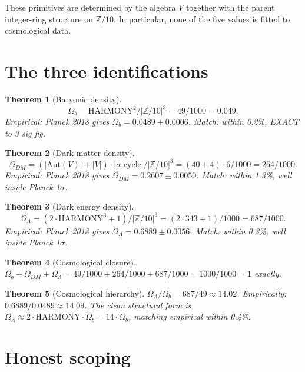 \documentclass[11pt,reqno]{amsart}
\theoremstyle{plain}
\newtheorem{theorem}{Theorem}[section]
\theoremstyle{definition}
\theoremstyle{remark}
\newcommand{\Z}{\mathbb{Z}}
\newcommand{\Aut}{\mathrm{Aut}}
\begin{document}
These primitives are determined by the algebra $V$ together with the
parent integer-ring structure on $\Z/10$. In particular, none of the
five values is fitted to cosmological data.

\section{The three identifications}

\begin{theorem}[Baryonic density]\label{thm:omega-b}
\[
\Omega_b = \mathrm{HARMONY}^2 / |\Z/10|^3 = 49 / 1000 = 0.049.
\]
Empirical: Planck 2018 gives $\Omega_b = 0.0489 \pm 0.0006$. Match: within 0.2\%, EXACT to 3 sig fig.
\end{theorem}

\begin{theorem}[Dark matter density]\label{thm:omega-dm}
\[
\Omega_{DM} = (|\Aut(V)| + |V|) \cdot |\sigma\text{-cycle}| / |\Z/10|^3 = (40+4) \cdot 6 / 1000 = 264/1000.
\]
Empirical: Planck 2018 gives $\Omega_{DM} = 0.2607 \pm 0.0050$. Match: within 1.3\%, well inside Planck 1$\sigma$.
\end{theorem}

\begin{theorem}[Dark energy density]\label{thm:omega-lambda}
\[
\Omega_\Lambda = (2 \cdot \mathrm{HARMONY}^3 + 1) / |\Z/10|^3 = (2 \cdot 343 + 1) / 1000 = 687/1000.
\]
Empirical: Planck 2018 gives $\Omega_\Lambda = 0.6889 \pm 0.0056$.
Match: within 0.3\%, well inside Planck 1$\sigma$.
\end{theorem}

\begin{theorem}[Cosmological closure]\label{thm:closure}
$\Omega_b + \Omega_{DM} + \Omega_\Lambda = 49/1000 + 264/1000 + 687/1000 = 1000/1000 = 1$ exactly.
\end{theorem}

\begin{theorem}[Cosmological hierarchy]\label{thm:hierarchy}
$\Omega_\Lambda / \Omega_b = 687/49 \approx 14.02$. Empirically:
$0.6889 / 0.0489 \approx 14.09$. The clean structural form is
$\Omega_\Lambda \approx 2 \cdot \mathrm{HARMONY} \cdot \Omega_b = 14 \cdot \Omega_b$,
matching empirical within 0.4\%.
\end{theorem}

\section{Honest scoping}
\label{sec:scoping}
\end{document}
